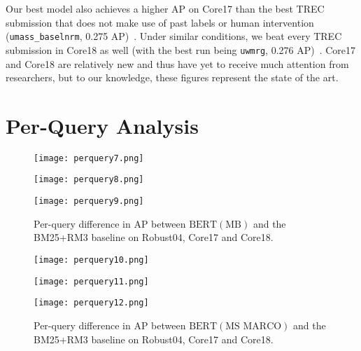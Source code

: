 Our best model also achieves a higher AP on Core17 than the best TREC submission that does not make use of past labels or human intervention (\texttt{umass\_baselnrm}, 0.275 AP)~\cite{allan2017trec}.
Under similar conditions, we beat every TREC submission in Core18 as well (with the best run being \texttt{uwmrg}, 0.276 AP)~\cite{core2018trec}.
Core17 and Core18 are relatively new and thus have yet to receive much attention from researchers, but to our knowledge, these figures represent the state of the art.

\section{Per-Query Analysis}


\begin{figure}[t!]
	\centering
    \begin{minipage}{0.3\textwidth}
        \centering
        \texttt{[image: perquery7.png]}
    \end{minipage}\hfill
    \begin{minipage}{0.3\textwidth}
        \centering
        \texttt{[image: perquery8.png]}
    \end{minipage}\hfill
    \begin{minipage}{0.3\textwidth}
        \centering
        \texttt{[image: perquery9.png]}
    \end{minipage}
\caption{Per-query difference in AP between $ \textrm{BERT}(\textrm{MB}) $ and the BM25+RM3 baseline on Robust04, Core17 and Core18.}
\label{fig:perquery-mb} 
\end{figure}

\begin{figure}[t!]
	\centering
    \begin{minipage}{0.3\textwidth}
        \centering
        \texttt{[image: perquery10.png]}
    \end{minipage}\hfill
    \begin{minipage}{0.3\textwidth}
        \centering
        \texttt{[image: perquery11.png]}
    \end{minipage}\hfill
    \begin{minipage}{0.3\textwidth}
        \centering
        \texttt{[image: perquery12.png]}
    \end{minipage}
\caption{Per-query difference in AP between $ \textrm{BERT}(\textrm{MS MARCO}) $ and the BM25+RM3 baseline on Robust04, Core17 and Core18.}
\label{fig:perquery-msmarco} 
\end{figure}

